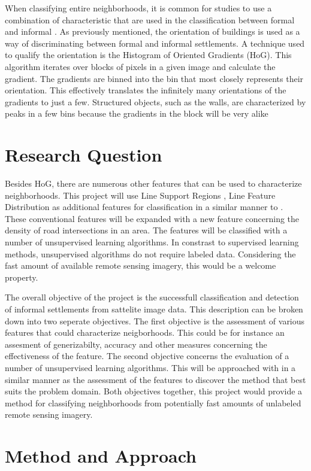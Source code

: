 \documentclass{article}
\begin{document}

When classifying entire neighborhoods, it is common for studies to use a combination
of characteristic that are used in the classification between formal and
informal \cite{graesser2012image}. As previously mentioned, the orientation of
buildings is used as a way of discriminating between formal and informal
settlements. A technique used to qualify the orientation is the Histogram of
Oriented Gradients (HoG)\cite{}. This algorithm iterates over blocks of pixels in a given
image and calculate the gradient. The gradients are binned into
the bin that most closely represents their orientation. This effectively
translates the infinitely many orientations of the gradients to just a few.
Structured objects, such as the walls, are characterized by peaks in a few
bins because the gradients in the block will be very alike






\section{Research Question}

Besides HoG, there are numerous other features that can be used to characterize
neighborhoods. This project will use Line Support Regions \cite{}, Line Feature
Distribution as additional features for classification in a similar manner
to \cite{graesser2012image}. These conventional features will be expanded with
a new feature concerning the density of road intersections in an area. The
features will be classified with a number of unsupervised learning algorithms.
In constrast to supervised learning methods, unsupervised algorithms do not
require labeled data. Considering the fast amount of available remote sensing
imagery, this would be a welcome property.

The overall objective of the project is the successfull classification and
detection of informal settlements from sattelite image data. This description
can be broken down into two seperate objectives. The first objective is the
assessment of various features that could characterize neigborhoods. This could
be for instance an assesment of generizabilty, accuracy and other measures
concerning the effectiveness of the feature. The second objective concerns the
evaluation of a number of unsupervised learning algorithms. This will be
approached with in a similar manner as the assessment of the features to
discover the method that best suits the problem domain. Both objectives
together, this project would provide a method for classifying neighborhoods
from potentially fast amounts of unlabeled remote sensing imagery.


\section{Method and Approach}

\printbibliography
\end{document}

